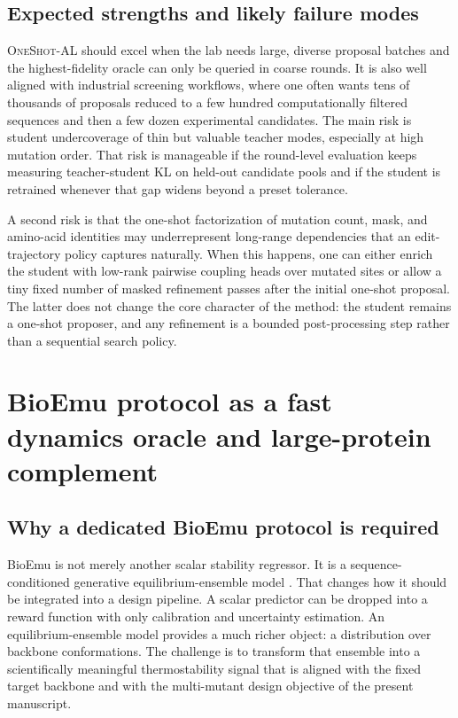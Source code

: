 \documentclass[11pt]{article}
\newcommand{\methodIII}{\textsc{OneShot-AL}}
\begin{document}
\subsection{Expected strengths and likely failure modes}

\methodIII{} should excel when the lab needs large, diverse proposal batches and the highest-fidelity oracle can only be queried in coarse rounds. It is also well aligned with industrial screening workflows, where one often wants tens of thousands of proposals reduced to a few hundred computationally filtered sequences and then a few dozen experimental candidates. The main risk is student undercoverage of thin but valuable teacher modes, especially at high mutation order. That risk is manageable if the round-level evaluation keeps measuring teacher-student KL on held-out candidate pools and if the student is retrained whenever that gap widens beyond a preset tolerance.

A second risk is that the one-shot factorization of mutation count, mask, and amino-acid identities may underrepresent long-range dependencies that an edit-trajectory policy captures naturally. When this happens, one can either enrich the student with low-rank pairwise coupling heads over mutated sites or allow a tiny fixed number of masked refinement passes after the initial one-shot proposal. The latter does not change the core character of the method: the student remains a one-shot proposer, and any refinement is a bounded post-processing step rather than a sequential search policy.


\section{BioEmu protocol as a fast dynamics oracle and large-protein complement}
\label{sec:bioemu}

\subsection{Why a dedicated BioEmu protocol is required}

BioEmu is not merely another scalar stability regressor. It is a sequence-conditioned generative equilibrium-ensemble model \citep{lewis2024bioemu}. That changes how it should be integrated into a design pipeline. A scalar predictor can be dropped into a reward function with only calibration and uncertainty estimation. An equilibrium-ensemble model provides a much richer object: a distribution over backbone conformations. The challenge is to transform that ensemble into a scientifically meaningful thermostability signal that is aligned with the fixed target backbone and with the multi-mutant design objective of the present manuscript.
\end{document}
